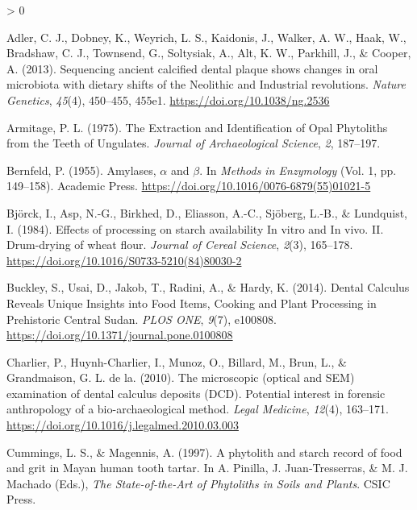 \documentclass[
]{article}
\newlength{\cslhangindent}
\newenvironment{CSLReferences}[2] %
 {%
  \setlength{\parindent}{0pt}
  \ifodd #1 \everypar{\setlength{\hangindent}{\cslhangindent}}\ignorespaces\fi
  \ifnum #2 > 0
  \setlength{\parskip}{#2\baselineskip}
  \fi
 }%
 {}
\begin{document}
\hypertarget{refs}{}
\begin{CSLReferences}{1}{0}
\leavevmode\hypertarget{ref-adlerSequencingAncientCalcified2013}{}%
Adler, C. J., Dobney, K., Weyrich, L. S., Kaidonis, J., Walker, A. W., Haak, W., Bradshaw, C. J., Townsend, G., Soltysiak, A., Alt, K. W., Parkhill, J., \& Cooper, A. (2013). Sequencing ancient calcified dental plaque shows changes in oral microbiota with dietary shifts of the {Neolithic} and {Industrial} revolutions. \emph{Nature Genetics}, \emph{45}(4), 450--455, 455e1. \url{https://doi.org/10.1038/ng.2536}

\leavevmode\hypertarget{ref-armitageExtractionIdentificationOpal1975}{}%
Armitage, P. L. (1975). The {Extraction} and {Identification} of {Opal Phytoliths} from the {Teeth} of {Ungulates}. \emph{Journal of Archaeological Science}, \emph{2}, 187--197.

\leavevmode\hypertarget{ref-bernfeldAmylase1955}{}%
Bernfeld, P. (1955). Amylases, {\(\alpha\)} and {\(\beta\)}. In \emph{Methods in {Enzymology}} (Vol. 1, pp. 149--158). {Academic Press}. \url{https://doi.org/10.1016/0076-6879(55)01021-5}

\leavevmode\hypertarget{ref-bjorckStarchProcessing1984}{}%
Björck, I., Asp, N.-G., Birkhed, D., Eliasson, A.-C., Sjöberg, L.-B., \& Lundquist, I. (1984). Effects of processing on starch availability {In} vitro and {In} vivo. {II}. {Drum}-drying of wheat flour. \emph{Journal of Cereal Science}, \emph{2}(3), 165--178. \url{https://doi.org/10.1016/S0733-5210(84)80030-2}

\leavevmode\hypertarget{ref-buckleyDentalCalculusCooking2014}{}%
Buckley, S., Usai, D., Jakob, T., Radini, A., \& Hardy, K. (2014). Dental {Calculus Reveals Unique Insights} into {Food Items}, {Cooking} and {Plant Processing} in {Prehistoric Central Sudan}. \emph{PLOS ONE}, \emph{9}(7), e100808. \url{https://doi.org/10.1371/journal.pone.0100808}

\leavevmode\hypertarget{ref-charlierSEMCalculus2010}{}%
Charlier, P., Huynh-Charlier, I., Munoz, O., Billard, M., Brun, L., \& Grandmaison, G. L. de la. (2010). The microscopic (optical and {SEM}) examination of dental calculus deposits ({DCD}). {Potential} interest in forensic anthropology of a bio-archaeological method. \emph{Legal Medicine}, \emph{12}(4), 163--171. \url{https://doi.org/10.1016/j.legalmed.2010.03.003}

\leavevmode\hypertarget{ref-cummingsMayanCalculus1997}{}%
Cummings, L. S., \& Magennis, A. (1997). A phytolith and starch record of food and grit in {Mayan} human tooth tartar. In A. Pinilla, J. Juan-Tresserras, \& M. J. Machado (Eds.), \emph{The {State}-of-the-{Art} of {Phytoliths} in {Soils} and {Plants}}. {CSIC Press}.


\end{CSLReferences}
\end{document}
